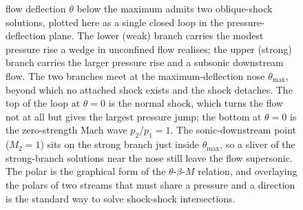 \begin{figure}[htbp]
{flow deflection $\theta$ below the maximum admits two oblique-shock
solutions, plotted here as a single closed loop in the
pressure-deflection plane. The lower (weak) branch carries the modest
pressure rise a wedge in unconfined flow realises; the upper (strong)
branch carries the larger pressure rise and a subsonic downstream flow.
The two branches meet at the maximum-deflection nose $\theta_{\max}$,
beyond which no attached shock exists and the shock detaches. The top of
the loop at $\theta=0$ is the normal shock, which turns the flow not at
all but gives the largest pressure jump; the bottom at $\theta=0$ is the
zero-strength Mach wave $p_2/p_1=1$. The sonic-downstream point
($M_2=1$) sits on the strong branch just inside $\theta_{\max}$, so a
sliver of the strong-branch solutions near the nose still leave the flow
supersonic. The polar is the graphical form of the
$\theta$-$\beta$-$M$ relation, and overlaying the polars of two streams
that must share a pressure and a direction is the standard way to solve
shock-shock intersections.}
\label{fig:vol03ch13:shock-polar}
\end{figure}
